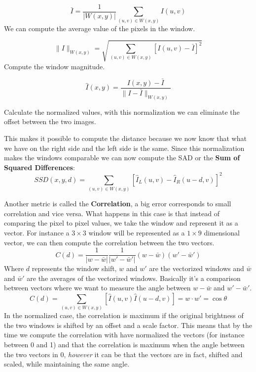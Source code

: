 \begin{multicols}{2}
\[
\bar{I} = \frac{1}{|W(x,y)|} \sum_{(u,v) \in W(x,y)} I(u,v)
\]
We can compute the average value of the pixels in the window.

\end{multicols}

\begin{multicols}{2}
\[
\| I \|_{W(x,y)} = \sqrt{\sum_{(u,v) \in W(x,y)} [I(u,v) - \bar{I}]^2}
\]
Compute the window magnitude.
\end{multicols}

\begin{multicols}{2}
\[
\hat{I}(x,y) = \frac{I(x,y) - \bar{I}}{\| I - \bar{I} \|_{W(x,y)}}
\]

Calculate the normalized values, with this normalization we can eliminate the offset between the two images.
\end{multicols}

This makes it possible to compute the distance because we now know that what we have on the right side and the left side is the same. Since this normalization makes the windows comparable we can now compute the SAD or the \textbf{Sum of Squared Differences}:
\[
SSD(x,y,d) = \sum_{(u,v) \in W(x,y)} [\hat{I}_L(u,v) - \hat{I}_R(u-d,v)]^2
\]

Another metric is called the \textbf{Correlation}, a big error corresponds to small correlation and vice versa. What happens in this case is that instead of comparing the pixel to pixel values, we take the window and represent it as a vector. For instance a \(3\times 3\) window will be represented as a \(1\times9\) dimensional vector, we can then compute the correlation between the two vectors.
\[
C(d) = \frac{1}{|w-\bar{w}|}\frac{1}{|w'- \bar{w}'|}(w-\bar{w})(w'-\bar{w}')
\]
Where \(d\) represents the window shift, \(w\) and \(w'\) are the vectorized windows and \(\bar{w}\) and \(\bar{w}'\) are the averages of the vectorized windows. Basically it's a comparison between vectors where we want to measure the angle between \(w - \bar{w}\) and \(w' - \bar{w}'\).
\[
C(d) = \sum_{(u,v) \in W(x,y)} [\hat{I}(u,v) \hat{I}(u-d,v)] = w\cdot w' = \cos\theta    
\]
In the normalized case, the correlation is maximum if the original brightness of the two windows is shifted by an offset and a scale factor. This means that by the time we compute the correlation with have normalized the vectors (for instance between 0 and 1) and that the correlation is maximum when the angle between the two vectors in 0, \textit{however} it can be that the vectors are in fact, shifted and scaled, while maintaining the same angle. 

